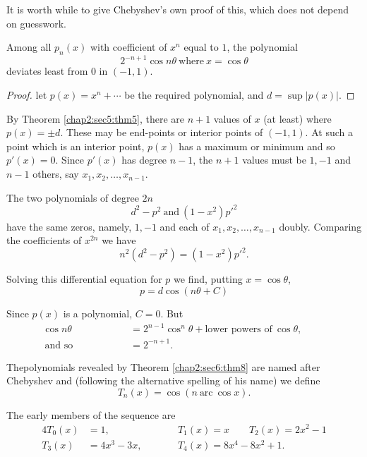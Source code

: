 It is worth while to give Chebyshev's own proof of this, which does
not depend on guesswork. 

\begin{theorem}\label{chap2:sec6:thm8}%
  Among all $p_n (x)$ with coefficient of $x^n$ equal to $1$, the polynomial
  $$
  2^{-n+1} \cos n \theta ~\text{where}~x= \cos \theta
  $$
  deviates least from $0$ in $(-1,1)$.
\end{theorem}

\begin{proof}
  let $p(x)=x^n+ \cdots$ be the required polynomial, and $d= \sup |p(x)|$.
\end{proof}

By Theorem \ref{chap2:sec5:thm5}, there are $n+1$ values of $x$ (at least) where
$p(x)=\pm d$. These may be end-points or interior points of
$(-1,1)$. At such a point which is an interior point, $p(x)$ has a
maximum or minimum and so $p'(x)=0$. Since $p'(x)$ has degree $n-1$,
the $n+1$ values must be $1,-1$ and $n-1$ others, say $x_1,x_2, \ldots
,x_{n-1}$.  

The two polynomials of degree $2n$
$$
d^2-p^2 ~\text{and}~ (1-x^2)p'^2
$$
have the same zeros, namely, $1,-1$ and each of $x_1,x_2,
\ldots,x_{n-1}$ doubly. Comparing the coefficients of $x^{2n}$ we have 
$$
n^2(d^2-p^2)=(1-x^2)p'^2.
$$

Solving this differential equation for $p$ we find, putting $x=\cos
\theta$,  
$$
p=d \cos (n \theta + C)
$$

Since $p(x)$ is a polynomial, $C=0$. But
\begin{align*}
  \cos n \theta &=2^{n-1} \cos^n \theta + \text{lower powers of}~ \cos
  \theta, \hspace{1cm}\\
  ~\text{and so}~ \hspace{2cm} &=2^{-n+1}.
\end{align*}

The\pageoriginale polynomials revealed by Theorem \ref{chap2:sec6:thm8} are named after Chebyshev and
(following the alternative spelling of his name) we define 
$$
T_n(x)=\cos (n ~\text{arc}~ \cos x).
$$

The early members of the sequence are
\begin{alignat*}{4}
  T_ 0(x) & =1,&& T_1(x)=x \qquad T_2(x)=2x^2-1\\
  T_3(x) & =4x^3 - 3x, \qquad& &T_4 (x)=8x^4 -8x^2 + 1.
\end{alignat*}

